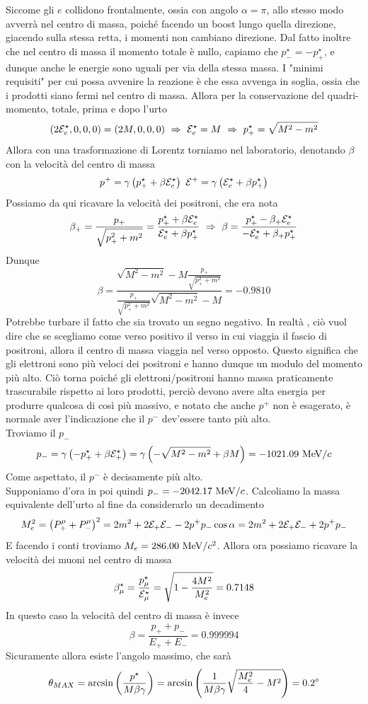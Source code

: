 \documentclass[12pt,twoside,a4]{article}
\begin{document}
\newpage
\begin{solution}
Siccome gli $e$ collidono frontalmente, ossia con angolo $\alpha = \pi$, allo stesso modo avverrà  nel centro di massa, poiché facendo un boost lungo quella direzione, giacendo sulla stessa retta, i momenti non cambiano direzione. Dal fatto inoltre che nel centro di massa il momento totale è nullo, capiamo che $ p^\star_- = - p^\star_+$, e dunque anche le energie sono uguali per via della stessa massa. I "minimi requisiti" per cui possa avvenire la reazione è che essa avvenga in soglia, ossia che i prodotti siano fermi nel centro di massa. Allora per la conservazione del quadri-momento, totale, prima e dopo l'urto
$$ \left({2 \mathcal{E}^\star_e,0,0,0}\right) = \left({2 M,0,0,0}\right)  \  \Rightarrow  \  
\mathcal{E}^\star_e = M  \  \Rightarrow  \  p^\star_+ = \sqrt{M^2 -m^2} $$
Allora con una trasformazione di Lorentz torniamo nel laboratorio, denotando $\beta$ con la velocità  del centro di massa
$$ p^+ = \gamma \left({ p^\star_+ + \beta \mathcal{E}^\star_e}\right)  \  
\mathcal{E}^+ = \gamma \left({ \mathcal{E}^\star_e + \beta p^\star_+  }\right) $$
Possiamo da qui ricavare la velocità  dei positroni, che era nota
$$ \beta_+ = \frac{p_+}{\sqrt{p_+^2 + m^2}} = \frac{ p^\star_+ + \beta \mathcal{E}^\star_e}{ \mathcal{E}^\star_e + \beta p^\star_+  }  \  \Rightarrow  \  
\beta = \frac{ p^\star_+ - \beta_+ \mathcal{E}^\star_e}{ - \mathcal{E}^\star_e + \beta_+ p^\star_+  }$$
Dunque 
$$ \beta = \frac{ \sqrt{M^2 -m^2} - M \frac{p_+}{\sqrt{p_+^2 +m^2}} }{\frac{p_+}{\sqrt{p_+^2 +m^2}} \sqrt{M^2 -m^2} - M } = -0.9810 $$
Potrebbe turbare il fatto che sia trovato un segno negativo. In realtà , ciò vuol dire che se scegliamo come verso positivo il verso in cui viaggia il fascio di positroni, allora il centro di massa viaggia nel verso opposto. Questo significa che gli elettroni sono più veloci dei positroni e hanno dunque un modulo del momento più alto. Ciò torna poiché gli elettroni/positroni hanno massa praticamente trascurabile rispetto ai loro prodotti, perciò devono avere alta energia per produrre qualcosa di così più massivo, e notato che anche $p^+$ non è esagerato, è normale aver l'indicazione che il $p^-$ dev'essere tanto più alto.
\\
Troviamo il $p_-$
$$ p_- = \gamma \left({ - p^\star_+ + \beta \mathcal{E}^\star_+}\right) = \gamma \left({ - \sqrt{M^2- m^2 } + \beta M}\right) =  - 1021.09 \ \mathrm{MeV}/c$$
Come aspettato, il $p^-$ è decisamente più alto.
\\
Supponiamo d'ora in poi quindi $p_- = - 2042.17 \ \mathrm{MeV}/c$. Calcoliamo la massa equivalente dell'urto al fine da considerarlo un decadimento
$$ M^2_e = \left({P^\mu_+ + P^\mu_-}\right)^2 = 2m^2 + 2 \mathcal{E}_+ \mathcal{E}_- - 2 p^+ p_- \cos \alpha =  2m^2 + 2 \mathcal{E}_+ \mathcal{E}_- + 2 p^+ p_- $$
E facendo i conti troviamo $M_e = 286.00 \ \mathrm{MeV}/c^2$. Allora ora possiamo ricavare la velocità  dei muoni nel centro di massa
$$ \beta^\star_\mu = \frac{p^\star_\mu}{\mathcal{E}^\star_\mu} = \sqrt{1 - \frac{4M^2}{M^2_e}} = 0.7148$$
In questo caso la velocità  del centro di massa è invece
$$ \beta = \frac{p_+ + p_-}{E_+ + E_-} = 0.999994 $$
Sicuramente allora esiste l'angolo massimo, che sarà 
$$ \theta_{MAX} = \arcsin \left({ \frac{p^\star}{M \beta \gamma}}\right) = \arcsin \left({ \frac{1}{M \beta \gamma} \sqrt{\frac{M^2_e}{4} - M^2}}\right) =  0.2^\circ$$
\end{solution}
\end{document}
